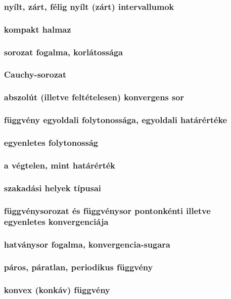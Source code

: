 \documentclass[12pt]{article}
\begin{document}
\subsubsection{nyílt, zárt, félig nyílt (zárt) intervallumok}
\subsubsection{kompakt halmaz}
\subsubsection{sorozat fogalma, korlátossága}
\subsubsection{Cauchy-sorozat}
\subsubsection{abszolút (illetve feltételesen) konvergens sor}
\subsubsection{függvény egyoldali folytonossága,
egyoldali határértéke}
\subsubsection{egyenletes folytonosság}
\subsubsection{a végtelen, mint határérték}
\subsubsection{szakadási helyek típusai}
\subsubsection{függvénysorozat és függvénysor pontonkénti illetve egyenletes konvergenciája}
\subsubsection{hatványsor fogalma, konvergencia-sugara}
\subsubsection{páros, páratlan, periodikus
függvény}
\subsubsection{konvex (konkáv) függvény}
\end{document}
